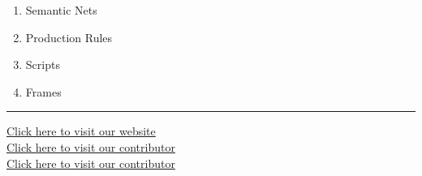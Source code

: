 \documentclass[11pt,a4paper]{article}
\begin{document}
\begin{enumerate}[label=(\roman*),leftmargin=*,itemsep=8pt]
\begin{enumerate}[label=(\alph*),itemsep=2pt]
    \item Semantic Nets
    \item Production Rules
    \item Scripts
    \item Frames
  \end{enumerate}
\end{enumerate}

\vfill
\rule{\linewidth}{0.4pt}

\begin{center}\small
\href{https://bhu-exam.vercel.app/}{Click here to visit our website}\\[4pt]\href{https://me-aryan.vercel.app/}{Click here to visit our contributor}\\[4pt]\href{https://quashan-me.vercel.app/}{Click here to visit our contributor}
\end{center}
\end{document}
